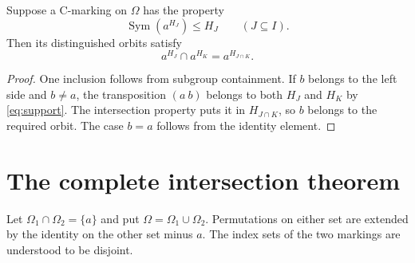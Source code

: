 \documentclass[a4paper,11pt]{article}
\newcommand{\Sym}{\operatorname{Sym}}
\begin{document}
\begin{lemma}\label{lem:orbits}
Suppose a C-marking on $\Omega$ has the property
\begin{equation}\label{eq:support}
 \Sym(a^{H_J})\leq H_J\qquad(J\subseteq I).
\end{equation}
Then its distinguished orbits satisfy
\[
 a^{H_J}\cap a^{H_K}=a^{H_{J\cap K}}.
\]
\end{lemma}
\begin{proof}
One inclusion follows from subgroup containment. If $b$ belongs to the
left side and $b\ne a$, the transposition $(a\ b)$ belongs to both
$H_J$ and $H_K$ by \eqref{eq:support}. The intersection property puts
it in $H_{J\cap K}$, so $b$ belongs to the required orbit. The case
$b=a$ follows from the identity element.
\end{proof}

\section{The complete intersection theorem}
Let $\Omega_1\cap\Omega_2=\{a\}$ and put
$\Omega=\Omega_1\cup\Omega_2$. Permutations on either set are extended
by the identity on the other set minus $a$. The index sets of the two
markings are understood to be disjoint.
\end{document}
